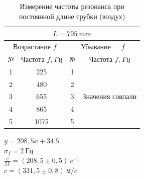 \documentclass[12pt]{article}
\begin{document}
		\noindent
	\begin{table}[h]

		\begin{center}
			\begin{tabular}{|c|c|c|c|}
			\hline
			\multicolumn{4}{|c|}{$L = 795\ mm$} \\
			\hline
			\multicolumn{2}{|c|}{Возрастание $f$} & \multicolumn{2}{|c|}{Убывание\ \ \    $f$}\\
			\hline
			№ & Частота $f$, \textit{Гц} & № & Частота $f$, \textit{Гц} \\
			\hline
			1& 225&1 &\multirow{5}{*}{Значения совпали}\\
			\cline{1-3}
			2& 480&2 &\\
			\cline{1-3}
			3& 655&3 &\\
			\cline{1-3}
			4& 865&4 &\\
			\cline{1-3}
			5& 1075&5 &\\
			\hline
		\end{tabular}
		\caption{Измерение частоты резонанса при постоянной длине трубки (воздух)}
	\end{center}
	\end{table}	
	
	
	\begin{minipage}{0.6\textwidth}
	\end{minipage}
	\vspace{0.05\textwidth}
	\begin{minipage}{0.25\textwidth}
		\centering
		$y = 208,5 x + 34.5$\\
		$\sigma_f = 2\ \textit{Гц}$\\
		$\frac{c}{2L} = (208,5 \pm 0,5)\  c^{-1}$\\
		$ c = (331,5 \pm 0,8)\ \textit{м/c}$\\
		
		
	\end{minipage}	
	
\end{document}
